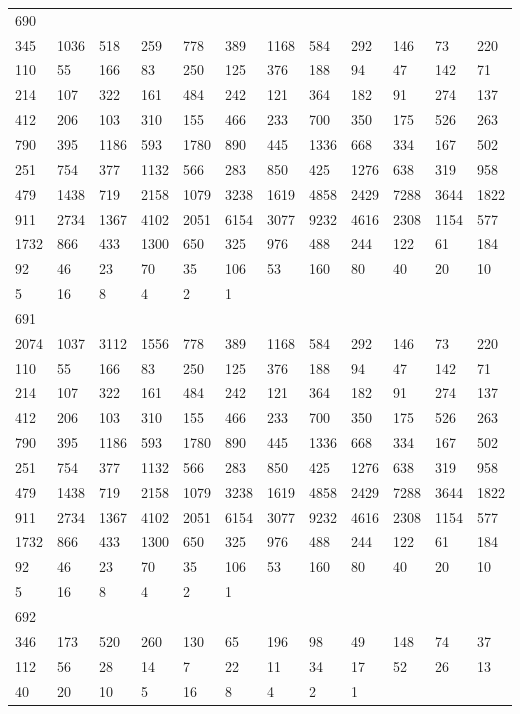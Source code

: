 \begin{longtable}{llllllllllll}
690&&&&&&&&&&&\\
345& 1036& 518& 259& 778& 389& 1168& 584& 292& 146& 73& 220\\
110& 55& 166& 83& 250& 125& 376& 188& 94& 47& 142& 71\\
214& 107& 322& 161& 484& 242& 121& 364& 182& 91& 274& 137\\
412& 206& 103& 310& 155& 466& 233& 700& 350& 175& 526& 263\\
790& 395& 1186& 593& 1780& 890& 445& 1336& 668& 334& 167& 502\\
251& 754& 377& 1132& 566& 283& 850& 425& 1276& 638& 319& 958\\
479& 1438& 719& 2158& 1079& 3238& 1619& 4858& 2429& 7288& 3644& 1822\\
911& 2734& 1367& 4102& 2051& 6154& 3077& 9232& 4616& 2308& 1154& 577\\
1732& 866& 433& 1300& 650& 325& 976& 488& 244& 122& 61& 184\\
92& 46& 23& 70& 35& 106& 53& 160& 80& 40& 20& 10\\
5& 16& 8& 4& 2& 1& \\

691&&&&&&&&&&&\\
2074& 1037& 3112& 1556& 778& 389& 1168& 584& 292& 146& 73& 220\\
110& 55& 166& 83& 250& 125& 376& 188& 94& 47& 142& 71\\
214& 107& 322& 161& 484& 242& 121& 364& 182& 91& 274& 137\\
412& 206& 103& 310& 155& 466& 233& 700& 350& 175& 526& 263\\
790& 395& 1186& 593& 1780& 890& 445& 1336& 668& 334& 167& 502\\
251& 754& 377& 1132& 566& 283& 850& 425& 1276& 638& 319& 958\\
479& 1438& 719& 2158& 1079& 3238& 1619& 4858& 2429& 7288& 3644& 1822\\
911& 2734& 1367& 4102& 2051& 6154& 3077& 9232& 4616& 2308& 1154& 577\\
1732& 866& 433& 1300& 650& 325& 976& 488& 244& 122& 61& 184\\
92& 46& 23& 70& 35& 106& 53& 160& 80& 40& 20& 10\\
5& 16& 8& 4& 2& 1& \\

692&&&&&&&&&&&\\
346& 173& 520& 260& 130& 65& 196& 98& 49& 148& 74& 37\\
112& 56& 28& 14& 7& 22& 11& 34& 17& 52& 26& 13\\
40& 20& 10& 5& 16& 8& 4& 2& 1& \\


\end{longtable}
